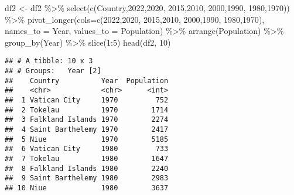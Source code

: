 \documentclass[
]{article}
\newenvironment{Shaded}{\begin{snugshade}}{\end{snugshade}}
\newcommand{\AttributeTok}[1]{\textcolor[rgb]{0.77,0.63,0.00}{#1}}
\newcommand{\DecValTok}[1]{\textcolor[rgb]{0.00,0.00,0.81}{#1}}
\newcommand{\FunctionTok}[1]{\textcolor[rgb]{0.00,0.00,0.00}{#1}}
\newcommand{\NormalTok}[1]{#1}
\newcommand{\OtherTok}[1]{\textcolor[rgb]{0.56,0.35,0.01}{#1}}
\newcommand{\SpecialCharTok}[1]{\textcolor[rgb]{0.00,0.00,0.00}{#1}}
\newcommand{\StringTok}[1]{\textcolor[rgb]{0.31,0.60,0.02}{#1}}
\begin{document}
\begin{Shaded}
\begin{Highlighting}[]
\NormalTok{df2 }\OtherTok{\textless{}{-}}\NormalTok{ df2 }\SpecialCharTok{\%\textgreater{}\%} \FunctionTok{select}\NormalTok{(}\FunctionTok{c}\NormalTok{(}\StringTok{\textquotesingle{}Country\textquotesingle{}}\NormalTok{,}\StringTok{\textquotesingle{}2022\textquotesingle{}}\NormalTok{,}\StringTok{\textquotesingle{}2020\textquotesingle{}}\NormalTok{,}
                       \StringTok{\textquotesingle{}2015\textquotesingle{}}\NormalTok{,}\StringTok{\textquotesingle{}2010\textquotesingle{}}\NormalTok{,}
                      \StringTok{\textquotesingle{}2000\textquotesingle{}}\NormalTok{,}\StringTok{\textquotesingle{}1990\textquotesingle{}}\NormalTok{,}
                      \StringTok{\textquotesingle{}1980\textquotesingle{}}\NormalTok{,}\StringTok{\textquotesingle{}1970\textquotesingle{}}\NormalTok{)) }\SpecialCharTok{\%\textgreater{}\%} \FunctionTok{pivot\_longer}\NormalTok{(}\AttributeTok{cols=}\FunctionTok{c}\NormalTok{(}\StringTok{\textquotesingle{}2022\textquotesingle{}}\NormalTok{,}\StringTok{\textquotesingle{}2020\textquotesingle{}}\NormalTok{,}
                       \StringTok{\textquotesingle{}2015\textquotesingle{}}\NormalTok{,}\StringTok{\textquotesingle{}2010\textquotesingle{}}\NormalTok{,}
                      \StringTok{\textquotesingle{}2000\textquotesingle{}}\NormalTok{,}\StringTok{\textquotesingle{}1990\textquotesingle{}}\NormalTok{,}
                      \StringTok{\textquotesingle{}1980\textquotesingle{}}\NormalTok{,}\StringTok{\textquotesingle{}1970\textquotesingle{}}\NormalTok{),}
                      \AttributeTok{names\_to =} \StringTok{\textquotesingle{}Year\textquotesingle{}}\NormalTok{, }\AttributeTok{values\_to =} \StringTok{\textquotesingle{}Population\textquotesingle{}}\NormalTok{) }\SpecialCharTok{\%\textgreater{}\%}
  \FunctionTok{arrange}\NormalTok{(Population) }\SpecialCharTok{\%\textgreater{}\%}
  \FunctionTok{group\_by}\NormalTok{(Year) }\SpecialCharTok{\%\textgreater{}\%}
  \FunctionTok{slice}\NormalTok{(}\DecValTok{1}\SpecialCharTok{:}\DecValTok{5}\NormalTok{)}
\FunctionTok{head}\NormalTok{(df2, }\DecValTok{10}\NormalTok{)}
\end{Highlighting}
\end{Shaded}

\begin{verbatim}
## # A tibble: 10 x 3
## # Groups:   Year [2]
##    Country          Year  Population
##    <chr>            <chr>      <int>
##  1 Vatican City     1970         752
##  2 Tokelau          1970        1714
##  3 Falkland Islands 1970        2274
##  4 Saint Barthelemy 1970        2417
##  5 Niue             1970        5185
##  6 Vatican City     1980         733
##  7 Tokelau          1980        1647
##  8 Falkland Islands 1980        2240
##  9 Saint Barthelemy 1980        2983
## 10 Niue             1980        3637
\end{verbatim}
\end{document}
